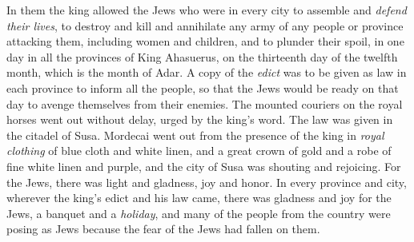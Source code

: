\begin{biblechapter}
\verse In them the king allowed the Jews who were in every city to assemble and \textit{defend their lives}, to destroy and kill and annihilate any army of any people or province attacking them, including women and children, and to plunder their spoil,
\verse in one day in all the provinces of King Ahasuerus, on the thirteenth day of the twelfth month, which is the month of Adar.
\verse A copy of the \textit{edict} was to be given as law in each province to inform all the people, so that the Jews would be ready on that day to avenge themselves from their enemies.
\verse The mounted couriers on the royal horses went out without delay, urged by the king’s word. The law was given in the citadel of Susa.
\verse Mordecai went out from the presence of the king in \textit{royal clothing} of blue cloth and white linen, and a great crown of gold and a robe of fine white linen and purple, and the city of Susa was shouting and rejoicing.
\verse For the Jews, there was light and gladness, joy and honor.
\verse In every province and city, wherever the king’s edict and his law came, there was gladness and joy for the Jews, a banquet and a \textit{holiday}, and many of the people from the country were posing as Jews because the fear of the Jews had fallen on them.
\end{biblechapter}

